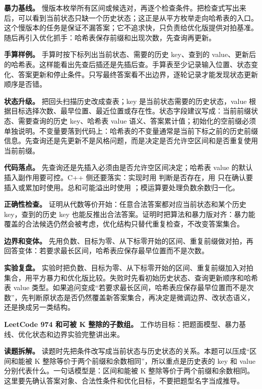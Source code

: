 \textbf{暴力基线。} 慢版本枚举所有区间或候选对，再逐个检查条件。把检查式写出来后，可以看到当前状态只缺一个历史状态；这正是从平方枚举走向哈希表的入口。这个慢版本的任务是保证不漏答案；它不追求快，只负责给优化版提供对拍基准。随后再引入优化抓手：哈希表保存前缀和出现次数，先查询再更新。

\textbf{手算样例。} 手算时按下标列出当前状态、需要的历史 key、查到的 value、更新后的哈希表。这样能看出先查后插还是先插后查。手算表至少记录输入位置、状态变化、答案更新和停止条件。只写最终答案看不出边界，逐轮记录才能发现状态更新顺序是否错。

\textbf{状态升级。} 把回头扫描历史改成查表；key 是当前状态需要的历史状态，value 根据目标选择次数、最早位置、最近位置或存在性。状态字段建议写成：当前前缀状态、需要查询的历史 key、哈希表 value 语义、答案累计值；初始化的空前缀必须单独说明。不变量要落到代码上：哈希表的不变量通常是当前下标之前的历史前缀信息。先查询还是先更新不是风格问题，而是决定是否允许空区间和是否重复使用当前前缀。

\textbf{代码落点。} 先查询还是先插入必须由是否允许空区间决定；哈希表 value 的默认插入副作用要可控。C++ 侧还要落实：实现时用  判断是否存在，用  只在确认要插入或累加时使用。总和可能溢出时使用 ；模运算要处理负数余数归一化。

\textbf{正确性检查。} 证明从代数等价开始：任意合法答案都对应当前状态和某个历史 key，查到的历史 key 也能反推出合法答案。证明时把算法和暴力版对齐：暴力能覆盖的合法候选仍然会被考虑，优化结构只替代重复检查，不改变答案集合。

\textbf{边界和变体。} 先用负数、目标为零、从下标零开始的区间、重复前缀做对拍，再回答变体：若要求最长区间，哈希表应保存最早位置而不是次数。

\textbf{实验复盘。} 实验时把负数、目标为零、从下标零开始的区间、重复前缀加入对拍集合，用平方暴力和优化版比较。失败时先看初始历史状态、查询更新顺序和哈希表 value 类型。如果追问变成“若要求最长区间，哈希表应保存最早位置而不是次数”，先判断原状态是否仍然覆盖新答案集合，再决定是微调边界、改状态语义，还是换成另一类结构。

\noindent\textbf{LeetCode 974 和可被 K 整除的子数组。} 工作坊目标：把题面模型、暴力基线、优化状态和边界实验完整讲出来。

\textbf{读题拆解。} 读题时先把条件改写成当前状态与历史状态的关系。本题可以压成“区间和能被 K 整除等价于两个前缀和余数相同”，所以重点是历史表的 key 和 value 分别代表什么。一句话模型是：区间和能被 K 整除等价于两个前缀和余数相同。这里要先确认答案对象、合法性条件和优化目标，不要把题型名字当成推导。


